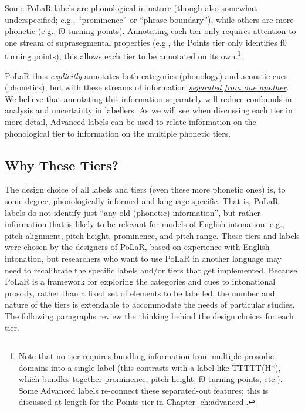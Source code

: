 \documentclass[11pt, twoside]{memoir}
\begin{document}
Some PoLaR labels are phonological in nature (though also somewhat underspecified; e.g., “prominence” or “phrase boundary”), while others are more phonetic (e.g., f0 turning points). Annotating each tier only requires attention to one stream of suprasegmental properties (e.g., the Points tier only identifies f0 turning points); this allows each tier to be annotated on its own.\footnote{Note that no tier requires bundling information from multiple prosodic domains into a single label (this contrasts with a label like TTTTT(H*), which bundles together prominence, pitch height, f0 turning points, etc.). Some Advanced labels re-connect these separated-out features; this is discussed at length for the Points tier in Chapter \ref{ch:advanced}.\label{fn:no bundling}}

PoLaR thus \textit{\uline{explicitly}} annotates both categories (phonology) and acoustic cues (phonetics), but with these streams of information \textit{\uline{separated from one another}}. We believe that annotating this information separately will reduce confounds in analysis and uncertainty in labellers. As we will see when discussing each tier in more detail, Advanced labels can be used to relate information on the phonological tier to information on the multiple phonetic tiers.

\subsection{Why These Tiers?}\label{sec:why-these-tiers}

The design choice of all labels and tiers (even these more phonetic ones) is, to some degree, phonologically informed and language-specific. That is, PoLaR labels do not identify just “any old (phonetic) information”, but rather information that is likely to be relevant for models of English intonation: e.g., pitch alignment, pitch height, prominence, and pitch range. These tiers and labels were chosen by the designers of PoLaR, based on experience with English intonation, but researchers who want to use PoLaR in another language may need to recalibrate the specific labels and/or tiers that get implemented. Because PoLaR is a framework for exploring the categories and cues to intonational prosody, rather than a fixed set of elements to be labelled, the number and nature of the tiers is extendable to accommodate the needs of particular studies. The following paragraphs review the thinking behind the design choices for each tier.
\end{document}
